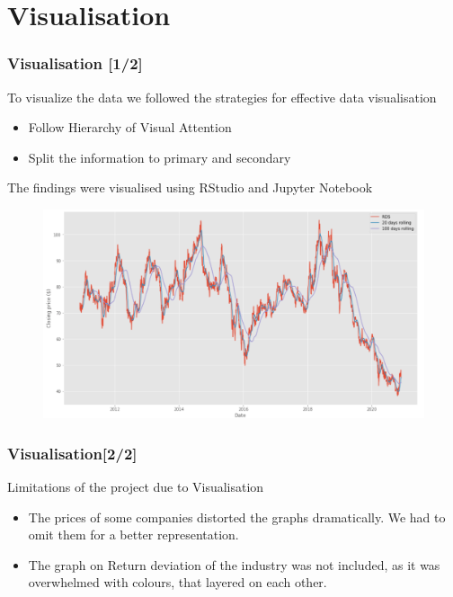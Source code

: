 \documentclass {beamer}
\begin{document}
\section{Visualisation}
\begin{frame}
\frametitle{Visualisation [1/2]}
To visualize the data we followed the strategies for effective data visualisation
\begin{itemize}
\item Follow Hierarchy of Visual Attention
\item Split the information to primary and secondary
\end{itemize}
The findings were visualised using RStudio and Jupyter Notebook

\begin{figure}[!h]
\includegraphics[scale=0.25]{SNP_SP}
\label{fig:snp1}
\end{figure}
\end{frame}


\begin{frame}
\frametitle{Visualisation[2/2]}
Limitations of the project due to Visualisation
\begin{itemize}
\item The prices of some companies distorted the graphs dramatically. We had to omit them for a better representation.
\item The graph on Return deviation of the industry was not included, as it was overwhelmed with colours, that layered on each other.
\end{itemize}
\end{frame}
\end{document}

